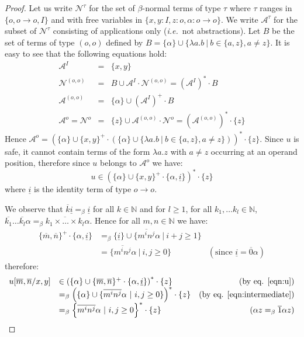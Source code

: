 \documentclass{llncs}
\newcommand{\encode}[1]{\overline{#1}} \newcommand\dps{\displaystyle}
\newcommand\union{\cup}
\newcommand\nat{\mathbb{N}}
\begin{document}
\begin{proof}
Let us write $\mathcal{N}^\tau$ for the set of $\beta$-normal terms of
type $\tau$ where $\tau$ ranges in $\{ o, o\rightarrow o, I \}$ and
with free variables in $\{ x,y:I, z:o, \alpha:o\rightarrow o\}$. We
write $\mathcal{A}^\tau$ for the subset of $\mathcal{N}^\tau$
consisting of applications only ({\it i.e.}~not abstractions).
Let $B$ be the set of terms of type $(o,o)$ defined by $B = \{ \alpha \} \union \{ \lambda a.b \ | \ b \in \{a,z\}, a \neq z \}$.
It is easy to see that the following equations hold:
\begin{eqnarray*}
\mathcal{A}^I &=& \{ x,y \} \\
\mathcal{N}^{(o,o)} &=& B \union \mathcal{A}^I \cdot
\mathcal{N}^{(o,o)} = (\mathcal{A}^I)^* \cdot B \\
\mathcal{A}^{(o,o)} &=& \{ \alpha \} \union (\mathcal{A}^I)^+ \cdot B \\
\mathcal{A}^o = \mathcal{N}^o &=& \{ z \} \union \mathcal{A}^{(o,o)} \cdot \mathcal{N}^o = (\mathcal{A}^{(o,o)})^* \cdot \{ z \}
\end{eqnarray*}
Hence $\mathcal{A}^o = \left( \{\alpha \} \union \{x,y\}^+ \cdot \left( \{\alpha \} \union \{\lambda a.b \ | \ b \in \{a,z\}, a \neq z \} \right) \right)^* \cdot \{ z \}$.
Since $u$ is safe, it cannot contain terms of the form $\lambda a . z$ with $a \neq z$ occurring at an operand position, therefore since $u$ belongs to $\mathcal{A}^o$ we have:
\begin{equation}
u \in \left( \{\alpha\} \union \{x,y\}^+ \cdot \{\alpha,
\underline{i} \} \right)^* \cdot \{ z \} \label{eqn:u}
\end{equation}
where $\underline{i}$ is the identity term of type $o\rightarrow o$.


We observe that $\encode{k} \underline{i} =_\beta \underline{i}$ for all $k \in \nat$ and for $l\geq 1$, for all $k_1, \ldots k_l \in \nat$,
$\encode{k_1}\ldots \encode{k_l} \alpha =_\beta
\encode{k_1\times \ldots \times k_l} \alpha$. Hence for all $m,n \in \nat$ we have:
\begin{equation}
\begin{array}{llr}
\{\encode{m},\encode{n}\}^+ \cdot \{\alpha, \underline{i} \} &=_\beta
\{ \underline{i} \} \union
\{ \encode{m^i n^j} \alpha \ |\ i+j \geq 1 \} \nonumber \\
&= \{ \encode{m^i n^j} \alpha \ |\ i,j \geq 0 \} & ( \mbox{since } \underline{i} = \encode{0} \alpha) \end{array}
\label{eqn:intermediate}
\end{equation}
therefore:
$$\begin{array}{llr}
u[\encode{m}, \encode{n}/x,y] &\in \left( \{ \alpha \} \union \{\encode{m},\encode{n}\}^+ \cdot \{\alpha, \underline{i} \} \right)^* \cdot \{ z \}  & \mbox{(by eq. \ref{eqn:u})} \\
&=_\beta \left( \{\alpha \} \union \{ \encode{m^i n^j}
\alpha \ | \ i,j \geq 0 \} \right)^* \cdot \{ z \} & \mbox{(by eq. \ref{eqn:intermediate})}  \\
&=_\beta \left\{ \encode{m^i n^j}
\alpha \ | \ i,j \geq 0 \right\}^* \cdot \{ z \} & \mbox{($\alpha z =_\beta \encode{1} \alpha z$)}
\end{array}$$


\end{proof}
\end{document}
